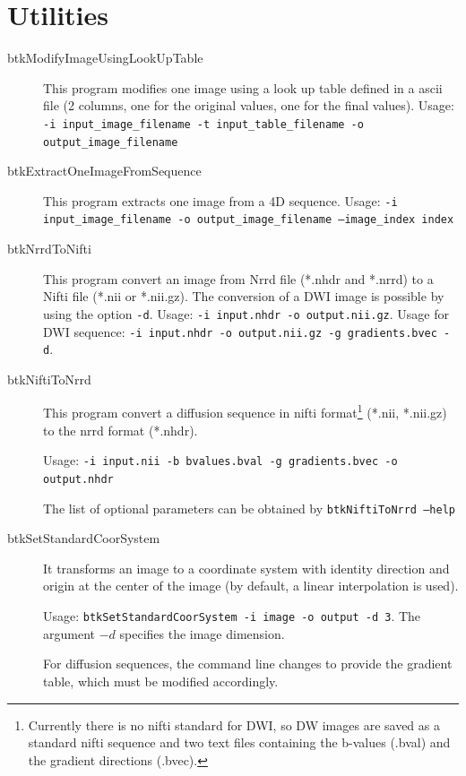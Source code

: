 \section{Utilities}
\label{sec:utilities}

\begin{description}

\item[btkModifyImageUsingLookUpTable] This program modifies one image using a
look up table defined in a ascii file (2 columns, one for the original values,
one for the final values). Usage: \texttt{-i input\_image\_filename -t
input\_table\_filename -o output\_image\_filename}
  
\item[btkExtractOneImageFromSequence] This program extracts one image from a 4D sequence. Usage: \texttt{-i input\_image\_filename -o output\_image\_filename --image\_index index}

\item[btkNrrdToNifti] This program convert an image from Nrrd file (*.nhdr and *.nrrd) to a Nifti file (*.nii or *.nii.gz). The conversion of a DWI image is possible by using the option \texttt{-d}. Usage: \texttt{-i input.nhdr -o output.nii.gz}. Usage for DWI sequence: \texttt{-i input.nhdr -o output.nii.gz -g gradients.bvec -d}.

\item[btkNiftiToNrrd] This program convert a diffusion sequence in nifti
format\footnote{Currently there is no nifti standard for DWI, so DW images are
saved as a standard nifti sequence and two text files containing the b-values
(.bval) and the gradient directions (.bvec).} (*.nii, *.nii.gz) to the nrrd
format (*.nhdr). 

Usage: \texttt{-i input.nii -b bvalues.bval -g gradients.bvec -o output.nhdr
}

The list of optional parameters can be obtained by \texttt{btkNiftiToNrrd
--help}

\item[btkSetStandardCoorSystem] It transforms an image to a coordinate
system with identity direction and origin at the center of the image
(by default, a linear interpolation is used).

Usage: \texttt{btkSetStandardCoorSystem -i image -o output -d 3}. The argument
$-d$ specifies the image dimension. 

For diffusion sequences, the command line changes to provide the gradient
table, which must be modified accordingly.


\end{description}
